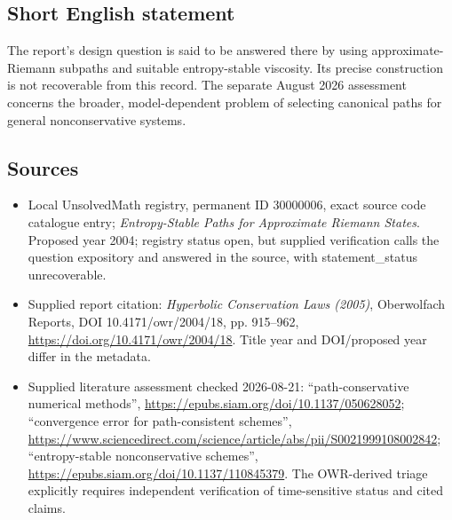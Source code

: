\documentclass[11pt]{article}
\begin{document}
\subsection{Short English statement}
The report's design question is said to be answered there by using approximate-Riemann subpaths and suitable entropy-stable viscosity. Its precise construction is not recoverable from this record. The separate August 2026 assessment concerns the broader, model-dependent problem of selecting canonical paths for general nonconservative systems.
\subsection{Sources}
\begin{itemize}
\item Local UnsolvedMath registry, permanent ID 30000006, exact source code catalogue entry; \emph{Entropy-Stable Paths for Approximate Riemann States}. Proposed year 2004; registry status open, but supplied verification calls the question expository and answered in the source, with statement\_status unrecoverable.
\item Supplied report citation: \emph{Hyperbolic Conservation Laws (2005)}, Oberwolfach Reports, DOI 10.4171/owr/2004/18, pp. 915--962, \url{https://doi.org/10.4171/owr/2004/18}. Title year and DOI/proposed year differ in the metadata.
\item Supplied literature assessment checked 2026-08-21: ``path-conservative numerical methods'', \url{https://epubs.siam.org/doi/10.1137/050628052}; ``convergence error for path-consistent schemes'', \url{https://www.sciencedirect.com/science/article/abs/pii/S0021999108002842}; ``entropy-stable nonconservative schemes'', \url{https://epubs.siam.org/doi/10.1137/110845379}. The OWR-derived triage explicitly requires independent verification of time-sensitive status and cited claims.
\end{itemize}
\end{document}
